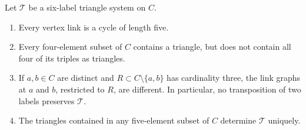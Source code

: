 \begin{lemma}\label{lem:six-properties}
Let $\mathcal T$ be a six-label triangle system on $C$.
\begin{enumerate}
\item Every vertex link is a cycle of length five.
\item Every four-element subset of $C$ contains a triangle, but does not
      contain all four of its triples as triangles.
\item If $a,b\in C$ are distinct and $R\subset C\setminus\{a,b\}$ has
      cardinality three, the link graphs at $a$ and $b$, restricted to $R$,
      are different. In particular, no transposition of two labels
      preserves $\mathcal T$.
\item The triangles contained in any five-element subset of $C$
      determine $\mathcal T$ uniquely.
\end{enumerate}
\end{lemma}

